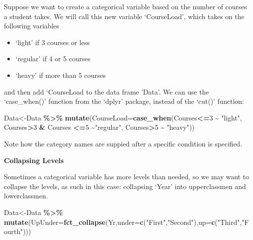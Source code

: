 \documentclass[
  openany]{book}
\newenvironment{Shaded}{\begin{snugshade}}{\end{snugshade}}
\newcommand{\AttributeTok}[1]{\textcolor[rgb]{0.13,0.29,0.53}{#1}}
\newcommand{\DecValTok}[1]{\textcolor[rgb]{0.00,0.00,0.81}{#1}}
\newcommand{\FunctionTok}[1]{\textcolor[rgb]{0.13,0.29,0.53}{\textbf{#1}}}
\newcommand{\NormalTok}[1]{#1}
\newcommand{\OtherTok}[1]{\textcolor[rgb]{0.56,0.35,0.01}{#1}}
\newcommand{\SpecialCharTok}[1]{\textcolor[rgb]{0.81,0.36,0.00}{\textbf{#1}}}
\newcommand{\StringTok}[1]{\textcolor[rgb]{0.31,0.60,0.02}{#1}}
\providecommand{\tightlist}{%
  \setlength{\itemsep}{0pt}\setlength{\parskip}{0pt}}
\begin{document}
Suppose we want to create a categorical variable based on the number of courses a student takes. We will call this new variable `CourseLoad', which takes on the following variables

\begin{itemize}
\tightlist
\item
  `light' if 3 courses or less
\item
  `regular' if 4 or 5 courses
\item
  `heavy' if more than 5 courses
\end{itemize}

and then add `CourseLoad to the data frame 'Data'. We can use the `case\_when()' function from the `dplyr' package, instead of the `cut()' function:

\begin{Shaded}
\begin{Highlighting}[]
\NormalTok{Data}\OtherTok{\textless{}{-}}\NormalTok{Data }\SpecialCharTok{\%\textgreater{}\%} 
  \FunctionTok{mutate}\NormalTok{(}\AttributeTok{CourseLoad=}\FunctionTok{case\_when}\NormalTok{(Courses}\SpecialCharTok{\textless{}=}\DecValTok{3} \SpecialCharTok{\textasciitilde{}} \StringTok{"light"}\NormalTok{,}
\NormalTok{                              Courses}\SpecialCharTok{\textgreater{}}\DecValTok{3} \SpecialCharTok{\&}\NormalTok{ Courses }\SpecialCharTok{\textless{}=}\DecValTok{5} \SpecialCharTok{\textasciitilde{}}\StringTok{"regular"}\NormalTok{,}
\NormalTok{                              Courses}\SpecialCharTok{\textgreater{}}\DecValTok{5} \SpecialCharTok{\textasciitilde{}} \StringTok{"heavy"}\NormalTok{))}
\end{Highlighting}
\end{Shaded}

Note how the category names are suppied after a specific condition is specified.

\textbf{Collapsing Levels}

Sometimes a categorical variable has more levels than needed, so we may want to collapse the levels, as such in this case: collapsing `Year' into upperclassmen and lowerclassmen.

\begin{Shaded}
\begin{Highlighting}[]
\NormalTok{Data}\OtherTok{\textless{}{-}}\NormalTok{Data }\SpecialCharTok{\%\textgreater{}\%} 
  \FunctionTok{mutate}\NormalTok{(}\AttributeTok{UpUnder=}\FunctionTok{fct\_collapse}\NormalTok{(Yr,}\AttributeTok{under=}\FunctionTok{c}\NormalTok{(}\StringTok{"First"}\NormalTok{,}\StringTok{"Second"}\NormalTok{),}\AttributeTok{up=}\FunctionTok{c}\NormalTok{(}\StringTok{"Third"}\NormalTok{,}\StringTok{"Fourth"}\NormalTok{)))}
\end{Highlighting}
\end{Shaded}
\end{document}

